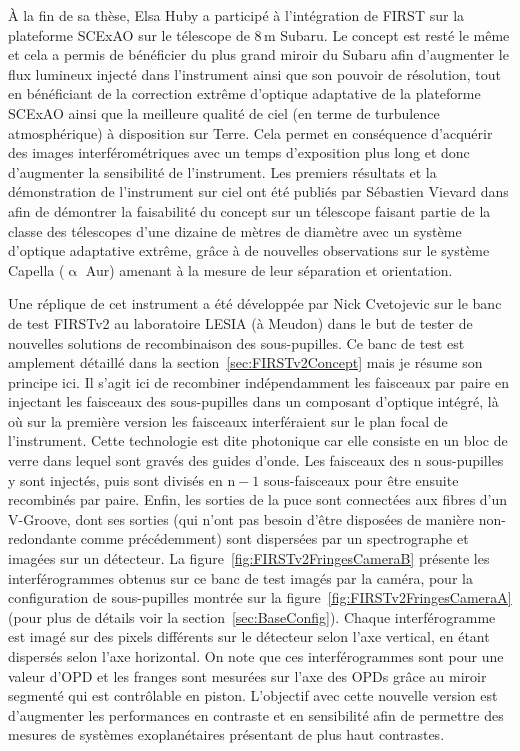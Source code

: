 À la fin de sa thèse, Elsa Huby a participé à l'intégration de \ac{FIRST} sur la plateforme \ac{SCExAO} sur le télescope de $8 \,$m Subaru. Le concept est resté le même et cela a permis de bénéficier du plus grand miroir du Subaru afin d'augmenter le flux lumineux injecté dans l'instrument ainsi que son pouvoir de résolution, tout en bénéficiant de la correction extrême d'optique adaptative de la plateforme \ac{SCExAO} ainsi que la meilleure qualité de ciel (en terme de turbulence atmosphérique) à disposition sur Terre. Cela permet en conséquence d'acquérir des images interférométriques avec un temps d'exposition plus long et donc d'augmenter la sensibilité de l'instrument. Les premiers résultats et la démonstration de l'instrument sur ciel ont été publiés par Sébastien Vievard dans \cite{vievard2020a, vievard2022} afin de démontrer la faisabilité du concept sur un télescope faisant partie de la classe des télescopes d'une dizaine de mètres de diamètre avec un système d'optique adaptative extrême, grâce à de nouvelles observations sur le système Capella ($\upalpha$ Aur) amenant à la mesure de leur séparation et orientation.

Une réplique de cet instrument a été développée par Nick Cvetojevic sur le banc de test \ac{FIRSTv2} au laboratoire \ac{LESIA} (à Meudon) dans le but de tester de nouvelles solutions de recombinaison des sous-pupilles. Ce banc de test est amplement détaillé dans la section~\ref{sec:FIRSTv2Concept} mais je résume son principe ici. Il s'agit ici de recombiner indépendamment les faisceaux par paire en injectant les faisceaux des sous-pupilles dans un composant d'optique intégré, là où sur la première version les faisceaux interféraient sur le plan focal de l'instrument. Cette technologie est dite photonique car elle consiste en un bloc de verre dans lequel sont gravés des guides d'onde. Les faisceaux des n sous-pupilles y sont injectés, puis sont divisés en $\text{n} - 1$ sous-faisceaux pour être ensuite recombinés par paire. Enfin, les sorties de la puce sont connectées aux fibres d'un V-Groove, dont ses sorties (qui n'ont pas besoin d'être disposées de manière non-redondante comme précédemment) sont dispersées par un spectrographe et imagées sur un détecteur. La figure~\ref{fig:FIRSTv2FringesCameraB} présente les interférogrammes obtenus sur ce banc de test imagés par la caméra, pour la configuration de sous-pupilles montrée sur la figure~\ref{fig:FIRSTv2FringesCameraA} (pour plus de détails voir la section~\ref{sec:BaseConfig}). Chaque interférogramme est imagé sur des pixels différents sur le détecteur selon l'axe vertical, en étant dispersés selon l'axe horizontal. On note que ces interférogrammes sont pour une valeur d'\ac{OPD} et les franges sont mesurées sur l'axe des \ac{OPD}s grâce au miroir segmenté qui est contrôlable en piston. L'objectif avec cette nouvelle version est d'augmenter les performances en contraste et en sensibilité afin de permettre des mesures de systèmes exoplanétaires présentant de plus haut contrastes.

